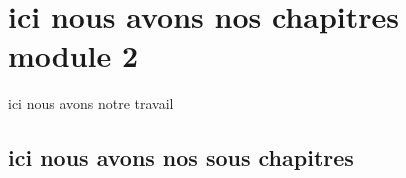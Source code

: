 \chapter{ici nous avons nos chapitres module 2}
	ici nous avons notre travail

\section{ici nous avons nos sous chapitres}
